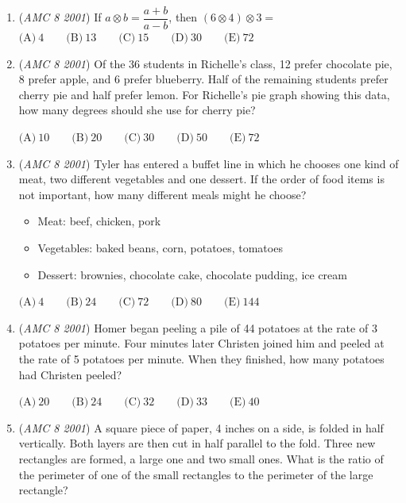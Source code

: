 \begin{enumerate}
	\item (\textit{AMC 8 2001}) If $a\otimes b = \dfrac{a + b}{a - b}$, then $(6\otimes 4)\otimes 3 =$
$\text{(A)}\ 4 \qquad \text{(B)}\ 13 \qquad \text{(C)}\ 15 \qquad \text{(D)}\ 30 \qquad \text{(E)}\ 72$


	\item (\textit{AMC 8 2001}) Of the 36 students in Richelle's class, 12 prefer chocolate pie, 8 prefer apple, and 6 prefer blueberry. Half of the remaining students prefer cherry pie and half prefer lemon. For Richelle's pie graph showing this data, how many degrees should she use for cherry pie?


 $\text{(A)}\ 10 \qquad \text{(B)}\ 20 \qquad \text{(C)}\ 30 \qquad \text{(D)}\ 50 \qquad \text{(E)}\ 72$


	\item (\textit{AMC 8 2001}) Tyler has entered a buffet line in which he chooses one kind of meat, two different vegetables and one dessert. If the order of food items is not important, how many different meals might he choose?


 
            \begin{itemize}
        \item Meat: beef, chicken, pork

        \item Vegetables: baked beans, corn, potatoes, tomatoes

        \item Dessert: brownies, chocolate cake, chocolate pudding, ice cream
            \end{itemize}
            $\text{(A)}\ 4 \qquad \text{(B)}\ 24 \qquad \text{(C)}\ 72 \qquad \text{(D)}\ 80 \qquad \text{(E)}\ 144$


	\item (\textit{AMC 8 2001}) Homer began peeling a pile of 44 potatoes at the rate of 3 potatoes per minute. Four minutes later Christen joined him and peeled at the rate of 5 potatoes per minute. When they finished, how many potatoes had Christen peeled?


 $\text{(A)}\ 20 \qquad \text{(B)}\ 24 \qquad \text{(C)}\ 32 \qquad \text{(D)}\ 33 \qquad \text{(E)}\ 40$


	\item (\textit{AMC 8 2001}) A square piece of paper, 4 inches on a side, is folded in half vertically. Both layers are then cut in half parallel to the fold. Three new rectangles are formed, a large one and two small ones. What is the ratio of the perimeter of one of the small rectangles to the perimeter of the large rectangle?



\end{enumerate}
